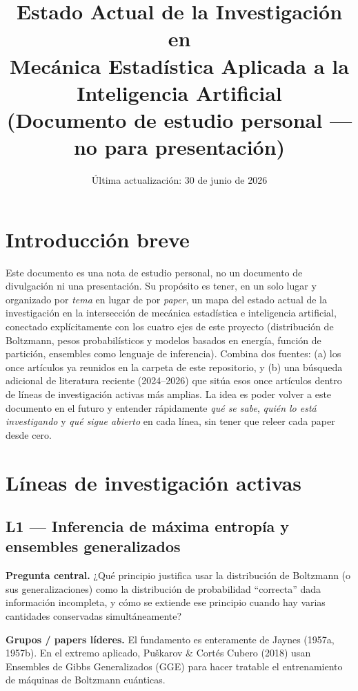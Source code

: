 \documentclass[12pt]{article}
\title{Estado Actual de la Investigación en\\ Mecánica Estadística Aplicada a la Inteligencia Artificial\\ \large (Documento de estudio personal --- no para presentación)}
\author{}
\date{Última actualización: 30 de junio de 2026}
\begin{document}
\maketitle

\section{Introducción breve}

Este documento es una nota de estudio personal, no un documento de divulgación ni una presentación. Su propósito es tener, en un solo lugar y organizado por \emph{tema} en lugar de por \emph{paper}, un mapa del estado actual de la investigación en la intersección de mecánica estadística e inteligencia artificial, conectado explícitamente con los cuatro ejes de este proyecto (distribución de Boltzmann, pesos probabilísticos y modelos basados en energía, función de partición, ensembles como lenguaje de inferencia). Combina dos fuentes: (a) los once artículos ya reunidos en la carpeta de este repositorio, y (b) una búsqueda adicional de literatura reciente (2024--2026) que sitúa esos once artículos dentro de líneas de investigación activas más amplias. La idea es poder volver a este documento en el futuro y entender rápidamente \emph{qué se sabe}, \emph{quién lo está investigando} y \emph{qué sigue abierto} en cada línea, sin tener que releer cada paper desde cero.

\section{Líneas de investigación activas}

\subsection{L1 --- Inferencia de máxima entropía y ensembles generalizados}

\textbf{Pregunta central.} ¿Qué principio justifica usar la distribución de Boltzmann (o sus generalizaciones) como la distribución de probabilidad ``correcta'' dada información incompleta, y cómo se extiende ese principio cuando hay varias cantidades conservadas simultáneamente?

\textbf{Grupos / papers líderes.} El fundamento es enteramente de Jaynes (1957a, 1957b). En el extremo aplicado, Puškarov \& Cortés Cubero (2018) usan Ensembles de Gibbs Generalizados (GGE) para hacer tratable el entrenamiento de máquinas de Boltzmann cuánticas.
\end{document}

